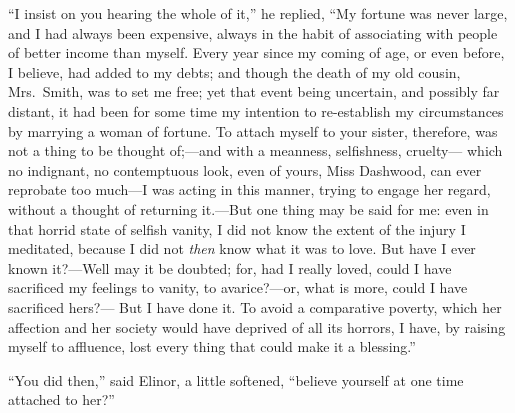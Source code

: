 ``I insist on you hearing the whole of it,'' he replied,
``My fortune was never large, and I had always been expensive,
always in the habit of associating with people of better
income than myself.  Every year since my coming of age,
or even before, I believe, had added to my debts; and though
the death of my old cousin, Mrs.\ Smith, was to set me free;
yet that event being uncertain, and possibly far distant,
it had been for some time my intention to re-establish my
circumstances by marrying a woman of fortune.  To attach
myself to your sister, therefore, was not a thing to be
thought of;---and with a meanness, selfishness, cruelty---%
which no indignant, no contemptuous look, even of yours,
Miss Dashwood, can ever reprobate too much---I was acting
in this manner, trying to engage her regard, without a
thought of returning it.---But one thing may be said
for me: even in that horrid state of selfish vanity,
I did not know the extent of the injury I meditated,
because I did not \emph{then} know what it was to love.
But have I ever known it?---Well may it be doubted; for, had I
really loved, could I have sacrificed my feelings to vanity,
to avarice?---or, what is more, could I have sacrificed hers?---%
But I have done it.  To avoid a comparative poverty,
which her affection and her society would have deprived
of all its horrors, I have, by raising myself to affluence,
lost every thing that could make it a blessing.''

``You did then,'' said Elinor, a little softened,
``believe yourself at one time attached to her?''

